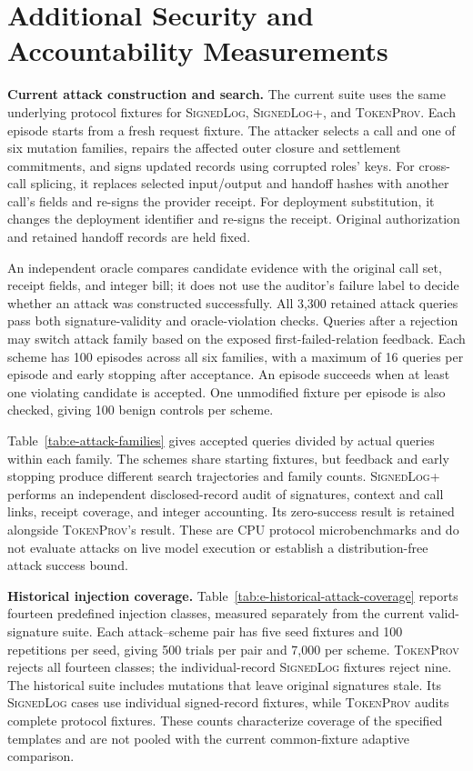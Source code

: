 \section{Additional Security and Accountability Measurements}
\label{app:e-security-accountability}

\noindent\textbf{Current attack construction and search.}
The current suite uses the same underlying protocol fixtures for
\textsc{SignedLog}, \textsc{SignedLog+}, and \textsc{TokenProv}.
Each episode starts from a fresh request fixture.
The attacker selects a call and one of six mutation families, repairs the
affected outer closure and settlement commitments, and signs updated records
using corrupted roles' keys.
For cross-call splicing, it replaces selected input/output and handoff hashes
with another call's fields and re-signs the provider receipt.
For deployment substitution, it changes the deployment identifier and re-signs
the receipt.
Original authorization and retained handoff records are held fixed.

An independent oracle compares candidate evidence with the original call set,
receipt fields, and integer bill; it does not use the auditor's failure label
to decide whether an attack was constructed successfully.
All 3,300 retained attack queries pass both signature-validity and
oracle-violation checks.
Queries after a rejection may switch attack family based on the exposed
first-failed-relation feedback.
Each scheme has 100 episodes across all six families, with a maximum of 16
queries per episode and early stopping after acceptance.
An episode succeeds when at least one violating candidate is accepted.
One unmodified fixture per episode is also checked, giving 100 benign controls
per scheme.

Table~\ref{tab:e-attack-families} gives accepted queries divided by actual
queries within each family.
The schemes share starting fixtures, but feedback and early stopping produce
different search trajectories and family counts.
\textsc{SignedLog+} performs an independent disclosed-record audit of signatures,
context and call links, receipt coverage, and integer accounting.
Its zero-success result is retained alongside \textsc{TokenProv}'s result.
These are CPU protocol microbenchmarks and do not evaluate attacks on live
model execution or establish a distribution-free attack success bound.



\noindent\textbf{Historical injection coverage.}
Table~\ref{tab:e-historical-attack-coverage} reports fourteen predefined
injection classes, measured separately from the current valid-signature suite.
Each attack--scheme pair has five seed fixtures and 100 repetitions per seed,
giving 500 trials per pair and 7,000 per scheme.
\textsc{TokenProv} rejects all fourteen classes; the individual-record
\textsc{SignedLog} fixtures reject nine.
The historical suite includes mutations that leave original signatures stale.
Its \textsc{SignedLog} cases use individual signed-record fixtures, while
\textsc{TokenProv} audits complete protocol fixtures.
These counts characterize coverage of the specified templates and are not
pooled with the current common-fixture adaptive comparison.

